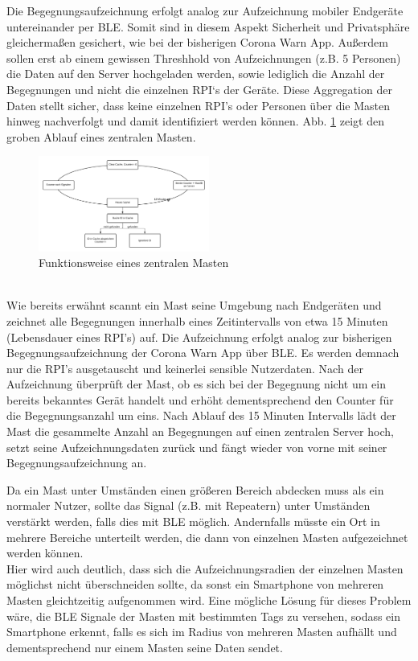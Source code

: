\documentclass[conference]{IEEEtran}
\begin{document}
Die Begegnungsaufzeichnung erfolgt analog zur Aufzeichnung mobiler Endgeräte untereinander per BLE. 
Somit sind in diesem Aspekt Sicherheit und Privatsphäre gleichermaßen gesichert, wie bei der bisherigen Corona Warn App. 
Außerdem sollen erst ab einem gewissen Threshhold von Aufzeichnungen (z.B. 5 Personen) die Daten auf den Server hochgeladen werden, sowie lediglich die Anzahl der Begegnungen und nicht die einzelnen RPI‘s der Geräte. 
Diese Aggregation der Daten stellt sicher, dass keine einzelnen RPI's oder Personen über die Masten hinweg nachverfolgt und damit identifiziert werden können. 
Abb. \ref{mast_func} zeigt den groben Ablauf eines zentralen Masten. \\ 
\begin{figure}[h]
	\centering
	\includegraphics[width=0.5\textwidth]{"Mast_functionality"}
	\caption{Funktionsweise eines zentralen Masten}
	\label{mast_func}
\end{figure}
\\
Wie bereits erwähnt scannt ein Mast seine Umgebung nach Endgeräten und zeichnet alle Begegnungen innerhalb eines Zeitintervalls von etwa 15 Minuten (Lebensdauer eines RPI's) auf. 
Die Aufzeichnung erfolgt analog zur bisherigen Begegnungsaufzeichnung der Corona Warn App über BLE. 
Es werden demnach nur die RPI's ausgetauscht und keinerlei sensible Nutzerdaten. 
Nach der Aufzeichnung überprüft der Mast, ob es sich bei der Begegnung nicht um ein bereits bekanntes Gerät handelt und erhöht dementsprechend den Counter für die Begegnungsanzahl um eins. 
Nach Ablauf des 15 Minuten Intervalls lädt der Mast die gesammelte Anzahl an Begegnungen auf einen zentralen Server hoch, setzt seine Aufzeichnungsdaten zurück und  fängt wieder von vorne mit seiner Begegnungsaufzeichnung an. 

Da ein Mast unter Umständen einen größeren Bereich abdecken muss als ein normaler Nutzer, sollte das Signal (z.B. mit Repeatern) unter Umständen verstärkt werden, falls dies mit BLE möglich.
Andernfalls müsste ein Ort in mehrere Bereiche unterteilt werden, die dann von einzelnen Masten aufgezeichnet werden können. \\
Hier wird auch deutlich, dass sich die Aufzeichnungsradien der einzelnen Masten möglichst nicht überschneiden sollte, da sonst ein Smartphone von mehreren Masten gleichtzeitig aufgenommen wird.
Eine mögliche Lösung für dieses Problem wäre, die BLE Signale der Masten mit bestimmten Tags zu versehen, sodass ein Smartphone erkennt, falls es sich im Radius von mehreren Masten aufhällt und dementsprechend nur einem Masten seine Daten sendet. 
\end{document}
